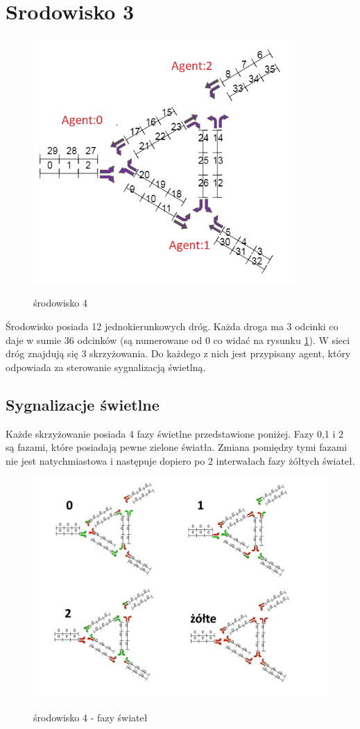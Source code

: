 \documentclass[12pt]{book}
\theoremstyle{plain}
\begin{document}
\section{Srodowisko 3}
\begin{figure}[H]
	\centering
	\includegraphics[width=10cm]{env_4_agenci}
	\label{fig:env_4_agenci}
	\caption{środowisko 4}
\end{figure}

Środowisko posiada 12 jednokierunkowych dróg. Każda droga ma 3 odcinki co daje w sumie 36 odcinków (są numerowane od 0 co widać na rysunku \ref{fig:env_4_agenci}).
W sieci dróg znajdują się 3 skrzyżowania. Do każdego z nich jest przypisany agent, który odpowiada za sterowanie sygnalizacją świetlną.
\subsection{Sygnalizacje świetlne}
Każde skrzyżowanie posiada 4 fazy świetlne przedstawione poniżej. Fazy 0,1 i 2 są fazami, które posiadają pewne zielone światła. Zmiana pomiędzy tymi fazami nie jest natychmiastowa i następuje dopiero po 2 interwałach fazy żółtych świateł.
\begin{figure}[H]
	\centering
	\includegraphics[width=14cm]{env_4_fazy}
	\label{fig:env_4_fazy}
	\caption{środowisko 4 - fazy świateł}
\end{figure}
\end{document}
